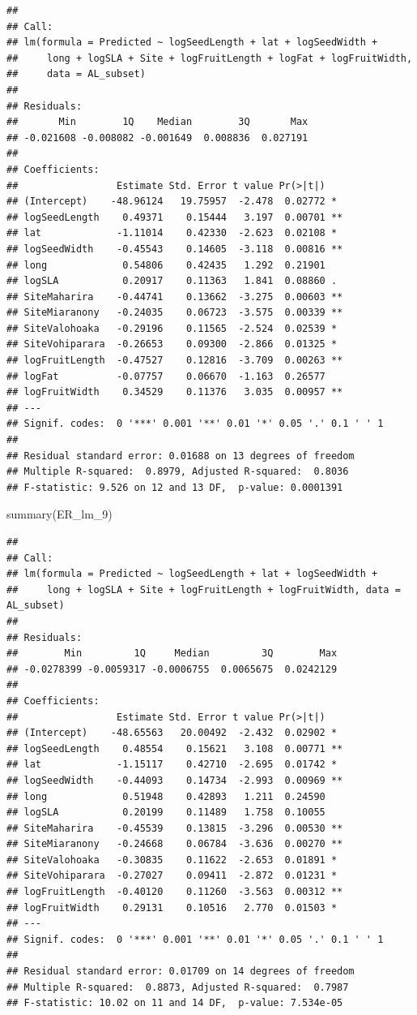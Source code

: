 \documentclass[
  12pt,
]{article}
\newenvironment{Shaded}{\begin{snugshade}}{\end{snugshade}}
\newcommand{\FunctionTok}[1]{\textcolor[rgb]{0.00,0.00,0.00}{#1}}
\newcommand{\NormalTok}[1]{#1}
\begin{document}
\begin{verbatim}
## 
## Call:
## lm(formula = Predicted ~ logSeedLength + lat + logSeedWidth + 
##     long + logSLA + Site + logFruitLength + logFat + logFruitWidth, 
##     data = AL_subset)
## 
## Residuals:
##       Min        1Q    Median        3Q       Max 
## -0.021608 -0.008082 -0.001649  0.008836  0.027191 
## 
## Coefficients:
##                 Estimate Std. Error t value Pr(>|t|)   
## (Intercept)    -48.96124   19.75957  -2.478  0.02772 * 
## logSeedLength    0.49371    0.15444   3.197  0.00701 **
## lat             -1.11014    0.42330  -2.623  0.02108 * 
## logSeedWidth    -0.45543    0.14605  -3.118  0.00816 **
## long             0.54806    0.42435   1.292  0.21901   
## logSLA           0.20917    0.11363   1.841  0.08860 . 
## SiteMaharira    -0.44741    0.13662  -3.275  0.00603 **
## SiteMiaranony   -0.24035    0.06723  -3.575  0.00339 **
## SiteValohoaka   -0.29196    0.11565  -2.524  0.02539 * 
## SiteVohiparara  -0.26653    0.09300  -2.866  0.01325 * 
## logFruitLength  -0.47527    0.12816  -3.709  0.00263 **
## logFat          -0.07757    0.06670  -1.163  0.26577   
## logFruitWidth    0.34529    0.11376   3.035  0.00957 **
## ---
## Signif. codes:  0 '***' 0.001 '**' 0.01 '*' 0.05 '.' 0.1 ' ' 1
## 
## Residual standard error: 0.01688 on 13 degrees of freedom
## Multiple R-squared:  0.8979, Adjusted R-squared:  0.8036 
## F-statistic: 9.526 on 12 and 13 DF,  p-value: 0.0001391
\end{verbatim}

\begin{Shaded}
\begin{Highlighting}[]
\FunctionTok{summary}\NormalTok{(ER\_lm\_9)}
\end{Highlighting}
\end{Shaded}

\begin{verbatim}
## 
## Call:
## lm(formula = Predicted ~ logSeedLength + lat + logSeedWidth + 
##     long + logSLA + Site + logFruitLength + logFruitWidth, data = AL_subset)
## 
## Residuals:
##        Min         1Q     Median         3Q        Max 
## -0.0278399 -0.0059317 -0.0006755  0.0065675  0.0242129 
## 
## Coefficients:
##                 Estimate Std. Error t value Pr(>|t|)   
## (Intercept)    -48.65563   20.00492  -2.432  0.02902 * 
## logSeedLength    0.48554    0.15621   3.108  0.00771 **
## lat             -1.15117    0.42710  -2.695  0.01742 * 
## logSeedWidth    -0.44093    0.14734  -2.993  0.00969 **
## long             0.51948    0.42893   1.211  0.24590   
## logSLA           0.20199    0.11489   1.758  0.10055   
## SiteMaharira    -0.45539    0.13815  -3.296  0.00530 **
## SiteMiaranony   -0.24668    0.06784  -3.636  0.00270 **
## SiteValohoaka   -0.30835    0.11622  -2.653  0.01891 * 
## SiteVohiparara  -0.27027    0.09411  -2.872  0.01231 * 
## logFruitLength  -0.40120    0.11260  -3.563  0.00312 **
## logFruitWidth    0.29131    0.10516   2.770  0.01503 * 
## ---
## Signif. codes:  0 '***' 0.001 '**' 0.01 '*' 0.05 '.' 0.1 ' ' 1
## 
## Residual standard error: 0.01709 on 14 degrees of freedom
## Multiple R-squared:  0.8873, Adjusted R-squared:  0.7987 
## F-statistic: 10.02 on 11 and 14 DF,  p-value: 7.534e-05
\end{verbatim}
\end{document}
